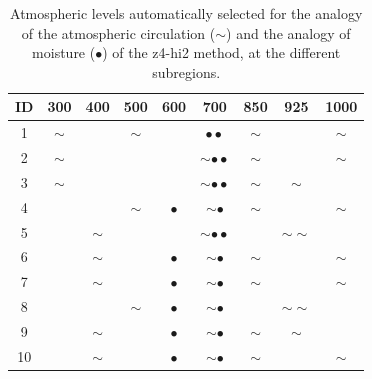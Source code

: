 \documentclass[twocol]{ametsoc}
\begin{document}
\begin{table}[htbp]
	\footnotesize
	\caption{Atmospheric levels automatically selected for the analogy of the atmospheric circulation ($\sim$) and the analogy of moisture ($\bullet$) of the z4-hi2 method, at the different subregions.}
	\begin{center}
		\begin{tabular}{ccccccccc}
			\hline \textbf{ID} & \textbf{300} & \textbf{400} & \textbf{500} & \textbf{600} & \textbf{700} & \textbf{850} & \textbf{925} & \textbf{1000} \\ 
			\hline 
			1  & $\sim$ &   & $\sim$ &   & $\bullet \bullet$  & $\sim$ &   & $\sim$ \\
			2  & $\sim$ &   &   &   & $\sim \bullet \bullet$ & $\sim$ &   & $\sim$ \\
			3  & $\sim$ &   &   &   & $\sim \bullet \bullet$ & $\sim$ & $\sim$ &   \\
			4  &   &   & $\sim$ & $\bullet$ & $\sim \bullet$ & $\sim$ &   & $\sim$ \\
			5  &   & $\sim$ &   &   & $\sim \bullet \bullet$ &   & $\sim \sim$ &   \\
			6  &   & $\sim$ &   & $\bullet$ & $\sim \bullet$ & $\sim$ &   & $\sim$ \\
			7  &   & $\sim$ &   & $\bullet$ & $\sim \bullet$ & $\sim$ &   & $\sim$ \\
			8  &   &   & $\sim$ & $\bullet$ & $\sim \bullet$ &   & $\sim \sim$ &   \\
			9  &   & $\sim$ &   & $\bullet$ & $\sim \bullet$ & $\sim$ & $\sim$ &   \\
			10 &   & $\sim$ &   & $\bullet$ & $\sim \bullet$ & $\sim$ &   & $\sim$ \\
			\hline 
		\end{tabular} 
	\end{center}
	\label{table:levels_GA_z4_hi2}
\end{table}
\end{document}
